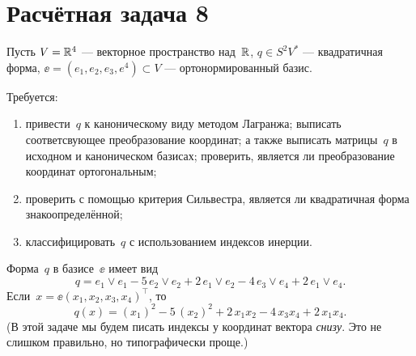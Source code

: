\section{Расчётная задача 8}

Пусть $V = \mathbb{R}^4$ --- векторное пространство над~$\mathbb{R}$, $q \in S^2V^*$ --- квадратичная форма, $\ee = (e_1, e_2, e_3, e^4) \subset V$ --- ортонормированный базис.

Требуется:
\begin{enumerate}[1)]
	\item привести~$q$ к каноническому виду методом Лагранжа; выписать соответсвующее преобразование координат; а также выписать матрицы~$q$ в исходном и каноническом базисах; проверить, является ли преобразование координат ортогональным;
	\item проверить с помощью критерия Сильвестра, является ли  квадратичная форма знакоопределённой;
	\item классифицировать~$q$ с использованием индексов инерции.
\end{enumerate}

Форма~$q$ в базисе~$\ee$ имеет вид
\[
	q =
	e_1 \vee e_1
	-
	5\,
	e_2 \vee e_2
	+
	2\,
	e_1 \vee e_2
	-
	4\,
	e_3 \vee e_4
	+
	2\,
	e_1 \vee e_4
	.
\]
Если~$x = \ee (x_1, x_2, x_3, x_4)^\top$, то
\[
	q(x)
	=
	(x_1)^2 - 5\,(x_2)^2 + 2\,x_1 x_2 - 4\,x_3 x_4 + 2\,x_1 x_4
	.
\]
(В этой задаче мы будем писать индексы у координат вектора \emph{снизу}. Это не слишком правильно, но типографически проще.)

